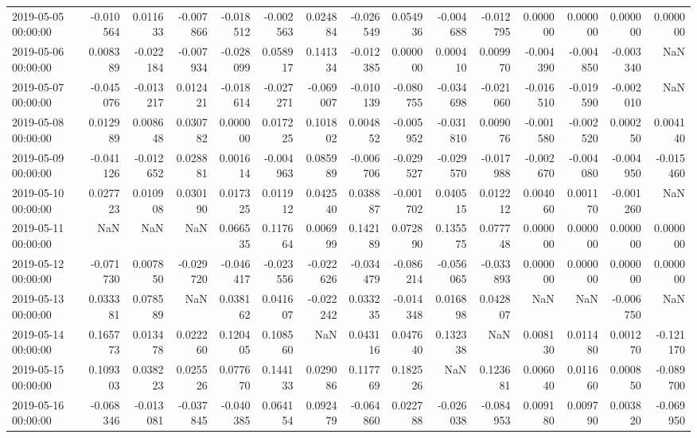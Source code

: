 \begin{tabular}{lrrrrrrrrrrrrrr}
2019-05-05 00:00:00 & -0.010564 & 0.011633 & -0.007866 & -0.018512 & -0.002563 & 0.024884 & -0.026549 & 0.054936 & -0.004688 & -0.012795 & 0.000000 & 0.000000 & 0.000000 & 0.000000 \\
2019-05-06 00:00:00 & 0.008389 & -0.022184 & -0.007934 & -0.028099 & 0.058917 & 0.141334 & -0.012385 & 0.000000 & 0.000410 & 0.009970 & -0.004390 & -0.004850 & -0.003340 & NaN \\
2019-05-07 00:00:00 & -0.045076 & -0.013217 & 0.012421 & -0.018614 & -0.027271 & -0.069007 & -0.010139 & -0.080755 & -0.034698 & -0.021060 & -0.016510 & -0.019590 & -0.002010 & NaN \\
2019-05-08 00:00:00 & 0.012989 & 0.008648 & 0.030782 & 0.000000 & 0.017225 & 0.101802 & 0.004852 & -0.005952 & -0.031810 & 0.009076 & -0.001580 & -0.002520 & 0.000250 & 0.004140 \\
2019-05-09 00:00:00 & -0.041126 & -0.012652 & 0.028881 & 0.001614 & -0.004963 & 0.085989 & -0.006706 & -0.029527 & -0.029570 & -0.017988 & -0.002670 & -0.004080 & -0.004950 & -0.015460 \\
2019-05-10 00:00:00 & 0.027723 & 0.010908 & 0.030190 & 0.017325 & 0.011912 & 0.042540 & 0.038887 & -0.001702 & 0.040515 & 0.012212 & 0.004060 & 0.001170 & -0.001260 & NaN \\
2019-05-11 00:00:00 & NaN & NaN & NaN & 0.066535 & 0.117664 & 0.006999 & 0.142189 & 0.072890 & 0.135575 & 0.077748 & 0.000000 & 0.000000 & 0.000000 & 0.000000 \\
2019-05-12 00:00:00 & -0.071730 & 0.007850 & -0.029720 & -0.046417 & -0.023556 & -0.022626 & -0.034479 & -0.086214 & -0.056065 & -0.033893 & 0.000000 & 0.000000 & 0.000000 & 0.000000 \\
2019-05-13 00:00:00 & 0.033381 & 0.078589 & NaN & 0.038162 & 0.041607 & -0.022242 & 0.033235 & -0.014348 & 0.016898 & 0.042807 & NaN & NaN & -0.006750 & NaN \\
2019-05-14 00:00:00 & 0.165773 & 0.013478 & 0.022260 & 0.120405 & 0.108560 & NaN & 0.043116 & 0.047640 & 0.132338 & NaN & 0.008130 & 0.011480 & 0.001270 & -0.121170 \\
2019-05-15 00:00:00 & 0.109303 & 0.038223 & 0.025526 & 0.077670 & 0.144133 & 0.029086 & 0.117769 & 0.182526 & NaN & 0.123681 & 0.006040 & 0.011660 & 0.000850 & -0.089700 \\
2019-05-16 00:00:00 & -0.068346 & -0.013081 & -0.037845 & -0.040385 & 0.064154 & 0.092479 & -0.064860 & 0.022788 & -0.026038 & -0.084953 & 0.009180 & 0.009790 & 0.003820 & -0.069950 \\

\end{tabular}
